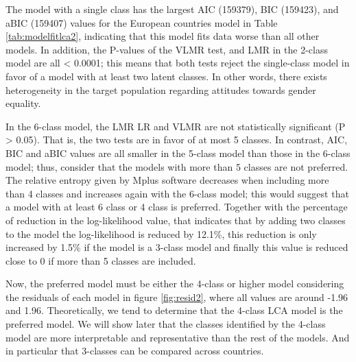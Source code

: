 \documentclass[12pt,a4paper,oneside]{reedthesis}
\begin{document}
The model with a single class has the largest AIC (159379), BIC (159423), and aBIC (159407) values for the European countries model in Table \ref{tab:modelfitlca2}, indicating that this model fits data worse than all other models. In addition, the P-values of the VLMR test, and LMR in the 2-class model are all \textless{} 0.0001; this means that both tests reject the single-class model in favor of a model with at least two latent classes. In other words, there exists heterogeneity in the target population regarding attitudes towards gender equality.

In the 6-class model, the LMR LR and VLMR are not statistically significant (P \textgreater{} 0.05). That is, the two tests are in favor of at most 5 classes. In contrast, AIC, BIC and aBIC values are all smaller in the 5-class model than those in the 6-class model; thus, consider that the models with more than 5 classes are not preferred. The relative entropy given by Mplus software decreases when including more than 4 classes and increases again with the 6-class model; this would suggest that a model with at least 6 class or 4 class is preferred. Together with the percentage of reduction in the log-likelihood value, that indicates that by adding two classes to the model the log-likelihood is reduced by 12.1\%, this reduction is only increased by 1.5\% if the model is a 3-class model and finally this value is reduced close to 0 if more than 5 classes are included.

Now, the preferred model must be either the 4-class or higher model considering the residuals of each model in figure \ref{fig:resid2}, where all values are around -1.96 and 1.96. Theoretically, we tend to determine that the 4-class LCA model is the preferred model. We will show later that the classes identified by the 4-class model are more interpretable and representative than the rest of the models. And in particular that 3-classes can be compared across countries.
\end{document}
